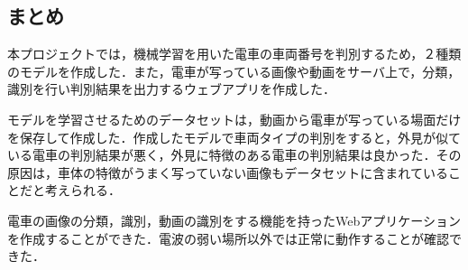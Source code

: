 \begin{multicols*}{2}
\section{まとめ}
本プロジェクトでは，機械学習を用いた電車の車両番号を判別するため，２種類のモデルを作成した．また，電車が写っている画像や動画をサーバ上で，分類，識別を行い判別結果を出力するウェブアプリを作成した．

モデルを学習させるためのデータセットは，動画から電車が写っている場面だけを保存して作成した．作成したモデルで車両タイプの判別をすると，外見が似ている電車の判別結果が悪く，外見に特徴のある電車の判別結果は良かった．その原因は，車体の特徴がうまく写っていない画像もデータセットに含まれていることだと考えられる．

電車の画像の分類，識別，動画の識別をする機能を持ったWebアプリケーションを作成することができた．電波の弱い場所以外では正常に動作することが確認できた．
\begin{thebibliography}{99}
\end{thebibliography}


\end{multicols*} 



